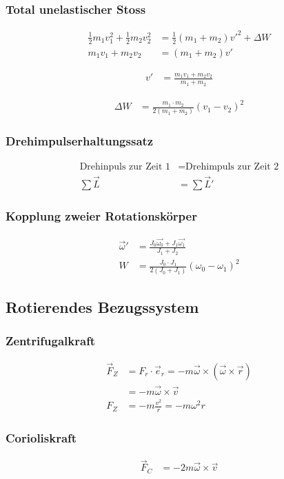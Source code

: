 \subsubsection{Total unelastischer Stoss}
\begin{align*}
\frac{1}{2}m_1v_1^2+\frac{1}{2}m_2v_2^2&=\frac{1}{2}\left(m_1+m_2\right)v'^2+\Delta W\\
m_1v_1+m_2v_2&=\left(m_1+m_2\right)v'
\end{align*}

\begin{align*}
v'&=\frac{m_1v_1+m_2v_2}{m_1+m_2}
\end{align*}

\begin{align*}
\Delta W	&=\frac{m_1\cdot m_2}{2\left(m_1+m_2\right)}\left(v_1-v_2\right)^2
\end{align*}



\subsubsection{Drehimpulserhaltungssatz}
\begin{align*}
\text{Drehinpuls zur Zeit 1} &= \text{Drehimpuls zur Zeit 2}\\
\sum \vec{L}&=\sum \vec{L}'
\end{align*}


\subsubsection{Kopplung zweier Rotationskörper}
\begin{align*}
\vec{\omega}'&=\frac{J_0\vec{\omega_0}+J_1\vec{\omega_1}}{J_1+J_2}\\
W&=\frac{J_0\cdot J_1}{2\left(J_0+J_1\right)}\left(\omega_0-\omega_1\right)^2
\end{align*}


\subsection{Rotierendes Bezugssystem}

\begin{multicols}{2}{}
\subsubsection{Zentrifugalkraft}
\begin{align*}
\vec{F}_Z&=F_r\cdot \vec{e}_r=-m\vec{\omega}\times\left(\vec{\omega}\times\vec{r}\right)\\
&=-m\vec{\omega}\times\vec{v}\\
F_Z&=-m\frac{v^2}{r}=-m\omega^2 r
\end{align*}


\subsubsection{Corioliskraft}
\begin{align*}
\vec{F}_C&=-2m\vec{\omega}\times\vec{v}
\end{align*}
\vspace{10mm}
\end{multicols}

